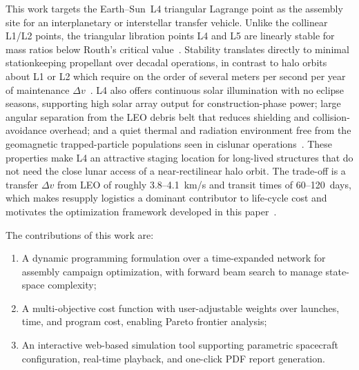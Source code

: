This work targets the Earth--Sun~L4 triangular Lagrange point as
the assembly site for an interplanetary or interstellar transfer 
vehicle. Unlike the collinear L1/L2 points, the triangular 
libration points L4 and L5 are linearly stable for mass ratios 
below Routh's critical value~\cite{l4_stability, gomez_l4_dynamics}.
Stability translates directly to minimal stationkeeping propellant 
over decadal operations, in contrast to halo orbits about L1 or L2 
which require on the order of several meters per second per year 
of maintenance $\Delta v$~\cite{folta_l4_transfers}. L4 also offers 
continuous solar illumination with no eclipse seasons, supporting 
high solar array output for construction-phase power; large angular
separation from the LEO debris belt that reduces shielding and
collision-avoidance overhead; and a quiet thermal and radiation
environment free from the geomagnetic trapped-particle
populations seen in cislunar
operations~\cite{folta_l4_transfers}. These properties make L4 an
attractive staging location for long-lived structures that do
not need the close lunar access of a near-rectilinear halo orbit. The
trade-off is a transfer $\Delta v$ from LEO of roughly
3.8--4.1~km/s and transit times of 60--120~days, which makes
resupply logistics a dominant contributor to life-cycle cost
and motivates the optimization framework developed in this
paper~\cite{belbruno_wbs,ho_logistics}.

The contributions of this work are:
\begin{enumerate}
  \item A dynamic programming formulation over a time-expanded
        network for assembly campaign optimization, with forward
        beam search to manage state-space complexity;
  \item A multi-objective cost function with user-adjustable
        weights over launches, time, and program cost, enabling
        Pareto frontier analysis;
  \item An interactive web-based simulation tool supporting
        parametric spacecraft configuration, real-time playback,
        and one-click PDF report generation.
\end{enumerate}

